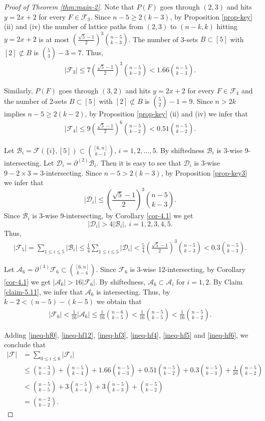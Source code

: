 \documentclass[11pt,a4paper]{article}
\newtheorem{false statement}{False statement}
\theoremstyle{definition}
\def\hf{\mathcal{F}}
\def\ha{\mathcal{A}}
\def\hb{\mathcal{B}}
\def\hd{\mathcal{D}}
\begin{document}
\begin{proof}[Proof of Theorem \ref{thm:main-2}]
Note that $P(F)$ goes through $(2,3)$ and hits $y=2x+2$ for every $F\in \hf_3$. Since $n-5\geq 2(k-3)$, by Proposition \ref{prop-key} (ii) and (iv) the number of lattice paths from $(2,3)$ to $(n-k,k)$ hitting $y=2x+2$ is at most $ \left(\frac{\sqrt{5}-1}{2}\right)^3 \binom{n-5}{k-3}$.
The number of 3-sets $B\subset [5]$ with $[2]\not\subset B$ is $\binom{5}{3}-3=7$. Thus,
\begin{align}\label{ineq-hf3}
|\hf_3| \leq 7 \left(\frac{\sqrt{5}-1}{2}\right)^3 \binom{n-5}{k-3}<1.66\binom{n-5}{k-3}.
\end{align}

Similarly, $P(F)$ goes through $(3,2)$ and hits $y=2x+2$ for every $F\in \hf_4$ and the number of 2-sets $B\subset [5]$ with $[2]\not\subset B$ is $\binom{5}{2}-1=9$.  Since $n> 2k$ implies $n-5\geq 2(k-2)$, by Proposition  \ref{prop-key} (ii) and (iv) we infer that
\begin{align}\label{ineq-hf4}
|\hf_4| \leq 9 \left(\frac{\sqrt{5}-1}{2}\right)^6 \binom{n-5}{k-2}<0.51\binom{n-5}{k-2}.
\end{align}

Let $\hb_i = \hf(\{i\},[5])\subset \binom{[6,n]}{k-1}$, $i=1,2,\ldots,5$. By shiftedness $\hb_i$ is 3-wise 9-intersecting. Let $\hd_i=\partial^{(2)} \hb_i$. Then it is easy to see that $\hd_i$ is 3-wise $9-2\times 3=3$-intersecting. Since $n-5>2(k-3)$, by Proposition \ref{prop-key3} we infer that
\[
|\hd_i| \leq \left(\frac{\sqrt{5}-1}{2}\right)^3 \binom{n-5}{k-3}.
\]
Since $\hb_i$ is  3-wise 9-intersecting, by Corollary \ref{cor-4.1} we get
\[
|\hd_i| > 4|\hb_i|,\ i=1,2,3,4,5.
\]
Thus,
\begin{align}\label{ineq-hf5}
|\hf_5| =\sum_{1\leq i\leq 5} |\hb_i| \leq \frac{1}{4}\sum_{1\leq i\leq 5} |\hd_i| <\frac{5}{4} \left(\frac{\sqrt{5}-1}{2}\right)^3 \binom{n-5}{k-3}<0.3\binom{n-5}{k-3}.
\end{align}

Let $\ha_6=\partial^{(4)}\hf_6\subset \binom{[6,n]}{k-4}$. Since $\hf_6$ is 3-wise 12-intersecting, by  Corollary \ref{cor-4.1} we get $|\ha_6|>16|\hf_6|$.  By shiftedness, $\ha_6\subset \ha_i$ for $i=1,2$. By Claim \ref{claim-5.11}, we infer that $\ha_6$ is intersecting. Thus, by $k-2<(n-5)-(k-5)$ we obtain that
\begin{align}\label{ineq-hf6}
|\hf_6| <\frac{1}{16}|\ha_6| \leq \frac{1}{16} \binom{n-6}{k-5}< \frac{1}{16} \binom{n-5}{k-5}<\frac{1}{16} \binom{n-5}{k-2}.
\end{align}

Adding \eqref{ineq-hf0}, \eqref{ineq-hf12}, \eqref{ineq-hf3}, \eqref{ineq-hf4},
\eqref{ineq-hf5} and \eqref{ineq-hf6}, we conclude that
\begin{align*}
|\hf| &=\sum_{0\leq i\leq 6} |\hf_i| \\[3pt]
&\leq \binom{n-3}{k-3}+\binom{n-5}{k-4}+1.66\binom{n-5}{k-3}
+0.51\binom{n-5}{k-2}+0.3\binom{n-5}{k-3}+\frac{1}{16} \binom{n-5}{k-2}\\[3pt]
&< \binom{n-5}{k-5} +3\binom{n-5}{k-4}+3\binom{n-5}{k-3}+\binom{n-5}{k-2}\\[3pt]
&=\binom{n-2}{k-2}.
\end{align*}
\end{proof}
\end{document}

